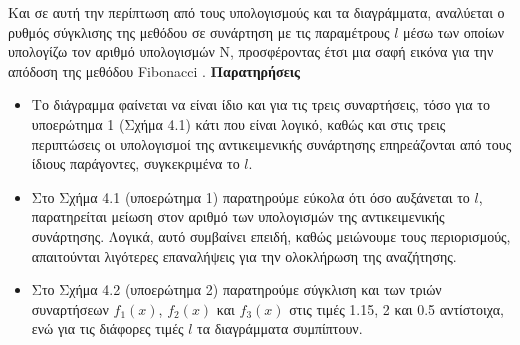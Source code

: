 \documentclass[a4paper,12pt]{report}
\newcommand{\en}{\selectlanguage{english}}
\newcommand{\gr}{\selectlanguage{greek}}
\begin{document}
\hspace{-0.6cm}Και σε αυτή την περίπτωση από τους υπολογισμούς και τα διαγράμματα, αναλύεται ο ρυθμός σύγκλισης της μεθόδου σε συνάρτηση με τις παραμέτρους \(l\) μέσω των οποίων υπολογίζω τον αριθμό υπολογισμών Ν, προσφέροντας έτσι μια σαφή εικόνα για την απόδοση της μεθόδου \en Fibonacci \gr.
\newpage
\vspace{0.8cm}
\hspace{-0.6cm}\textbf{Παρατηρήσεις}
\begin{itemize}
    \item Το διάγραμμα φαίνεται να είναι ίδιο και για τις τρεις συναρτήσεις, τόσο για το υποερώτημα 1 (Σχήμα 4.1) κάτι που είναι λογικό, καθώς και στις τρεις περιπτώσεις οι υπολογισμοί της αντικειμενικής συνάρτησης επηρεάζονται από τους ίδιους παράγοντες, συγκεκριμένα το \( l \).
    \item Στο Σχήμα 4.1 (υποερώτημα 1) παρατηρούμε εύκολα ότι όσο αυξάνεται το \( l \), παρατηρείται μείωση στον αριθμό των υπολογισμών της αντικειμενικής συνάρτησης. Λογικά, αυτό συμβαίνει επειδή, καθώς μειώνουμε τους περιορισμούς, απαιτούνται λιγότερες επαναλήψεις για την ολοκλήρωση της αναζήτησης.
    \item Στο Σχήμα 4.2 (υποερώτημα 2) παρατηρούμε σύγκλιση και των τριών συναρτήσεων \( f_1(x) \), \( f_2(x) \) και \( f_3(x) \) στις τιμές 1.15, 2 και 0.5 αντίστοιχα, ενώ για τις διάφορες τιμές \( l \) τα διαγράμματα συμπίπτουν.
\end{itemize}
\end{document}
